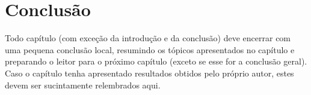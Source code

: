 



%
%
 

\section{Conclusão}

Todo capítulo (com exceção da introdução e da conclusão) deve encerrar com uma pequena conclusão local, resumindo os tópicos apresentados no capítulo e preparando o leitor para o próximo capítulo (exceto se esse for a conclusão geral). Caso o capítulo tenha apresentado resultados obtidos pelo próprio autor, estes devem ser sucintamente relembrados aqui.

